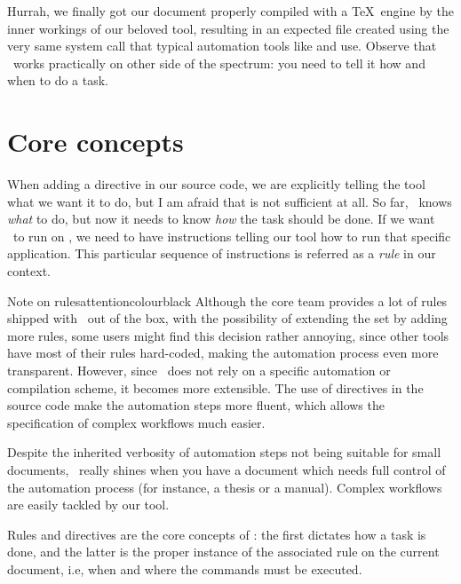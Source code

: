 Hurrah, we finally got our document properly compiled with a \TeX\ engine by the inner workings of our beloved tool, resulting in an expected  file created using the very same system call that typical automation tools like  and  use. Observe that \arara\ works practically on other side of the spectrum: you need to tell it how and when to do a task.

\section{Core concepts}
\label{sec:coreconcepts}

When adding a directive in our source code, we are explicitly telling the tool what we want it to do, but I am afraid that is not sufficient at all. So far, \arara\ knows \emph{what} to do, but now it needs to know \emph{how} the task should be done. If we want \arara\ to run  on , we need to have instructions telling our tool how to run that specific application. This particular sequence of instructions is referred as a \emph{rule} in our context.

\begin{messagebox}{Note on rules}{attentioncolour}{\icattention}{black}
Although the core team provides a lot of rules shipped with \arara\ out of the box, with the possibility of extending the set by adding more rules, some users might find this decision rather annoying, since other tools have most of their rules hard-coded, making the automation process even more transparent. However, since \arara\ does not rely on a specific automation or compilation scheme, it becomes more extensible. The use of directives in the source code make the automation steps more fluent, which allows the specification of complex workflows much easier.
\end{messagebox}

Despite the inherited verbosity of automation steps not being suitable for small documents, \arara\ really shines when you have a document which needs full control of the automation process (for instance, a thesis or a manual). Complex workflows are easily tackled by our tool.

Rules and directives are the core concepts of \arara: the first dictates how a task is done, and the latter is the proper instance of the associated rule on the current document, i.e, when and where the commands must be executed.

